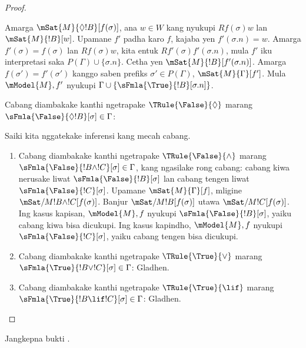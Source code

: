 \documentclass[../../../include/open-logic-section]{subfiles}
\begin{document}
\begin{proof}
\begin{enumerate}
{{  Amarga $\mSat{M}{\Diamond !B}[f(\sigma)]$, ana $w \in W$ kang nyukupi
  $Rf(\sigma)w$ lan $\mSat{M}{!B}[w]$. Upamane $f'$ padha karo $f$,
  kajaba yen $f'(\sigma.n) = w$. Amarga $f'(\sigma) = f(\sigma)$ lan
  $Rf(\sigma)w$, kita entuk $Rf'(\sigma)f'(\sigma.n)$, mula $f'$ iku
  interpretasi saka $P(\Gamma) \cup \{\sigma.n\}$. Cetha yen
  $\mSat{M}{!B}[f'(\sigma.n)]$. Amarga $f(\sigma') = f'(\sigma')$
  kanggo saben prefiks $\sigma' \in P(\Gamma)$,
  $\mSat{M}{\Gamma}[f']$. Mula $\mModel{M}, f'$ nyukupi $\Gamma \cup
  \{\sFmla{\True}{!B}[\sigma.n]\}$.}
\item Cabang diambakake kanthi ngetrapake $\TRule{\False}{\Diamond}$ marang
  $\sFmla{\False}{\Diamond !B}[\sigma] \in \Gamma$:
  }{}
\end{enumerate}
Saiki kita nggatekake inferensi kang mecah cabang.
\begin{enumerate}
\item Cabang diambakake kanthi ngetrapake $\TRule{\False}{\land}$ marang
  $\sFmla{\False}{!B \land !C}[\sigma] \in \Gamma$, kang ngasilake
  rong cabang: cabang kiwa nerusake liwat
  $\sFmla{\False}{!B}[\sigma]$ lan cabang tengen liwat
  $\sFmla{\False}{!C}[\sigma]$. Upamane $\mSat{M}{\Gamma}[f]$,
  mligine $\mSat/{M}{!B \land !C}[f(\sigma)]$. Banjur
  $\mSat/{M}{!B}[f(\sigma)]$ utawa $\mSat/{M}{!C}[f(\sigma)]$.
  Ing kasus kapisan, $\mModel{M}, f$ nyukupi
  $\sFmla{\False}{!B}[\sigma]$, yaiku cabang kiwa bisa dicukupi.
  Ing kasus kapindho, $\mModel{M}, f$ nyukupi
  $\sFmla{\False}{!C}[\sigma]$, yaiku cabang tengen bisa dicukupi.
\item Cabang diambakake kanthi ngetrapake $\TRule{\True}{\lor}$ marang
    $\sFmla{\True}{!B \lor !C}[\sigma] \in \Gamma$: Gladhen.
\item Cabang diambakake kanthi ngetrapake $\TRule{\True}{\lif}$ marang
    $\sFmla{\True}{!B \lif !C}[\sigma] \in \Gamma$: Gladhen.
\end{enumerate}
\end{proof}

\begin{prob}
Jangkepna bukti .
\end{prob}
\end{document}
